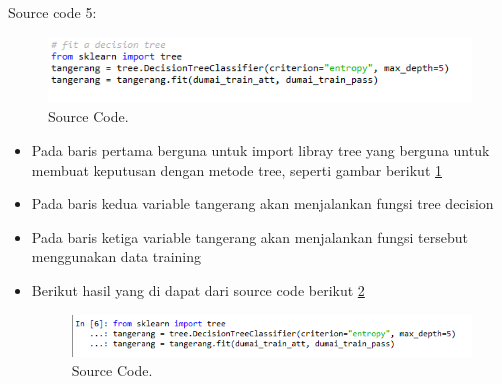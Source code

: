 Source code 5:
		\begin{figure}[ht]
		\centerline{\includegraphics[width=1\textwidth]{figures/im/imQ5.png}}
		\caption{Source Code.}
		\label{limaQ}
		\end{figure}
\begin{itemize}
\item Pada baris pertama berguna untuk import libray tree yang berguna untuk membuat keputusan dengan metode tree, seperti gambar berikut \ref{limaQ}
\item Pada baris kedua variable tangerang akan menjalankan fungsi tree decision
\item Pada baris ketiga variable tangerang akan menjalankan fungsi tersebut menggunakan data training
\item Berikut hasil yang di dapat dari source code berikut \ref{limaC}
		\begin{figure}[ht]
		\centerline{\includegraphics[width=1\textwidth]{figures/im/imCode5.png}}
		\caption{Source Code.}
		\label{limaC}
		\end{figure}
\end{itemize}


